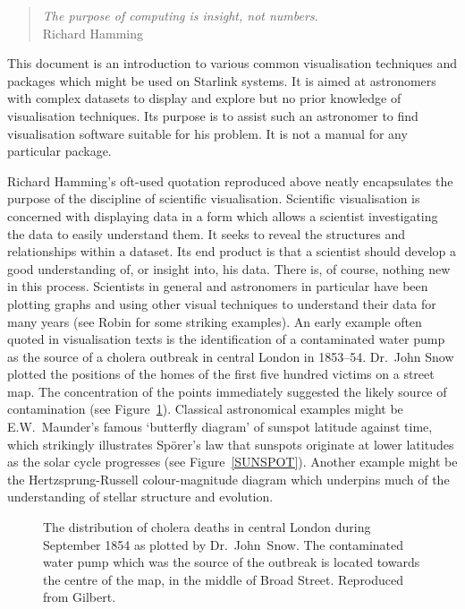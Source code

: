 \documentclass[twoside,11pt]{article}
\begin{document}
\begin{htmlonly}
\begin{quote}
{\it The purpose of computing is insight, not numbers.} \\
Richard Hamming
\end{quote}
\end{htmlonly}

This document is an introduction to various common visualisation
techniques and packages which might be used on Starlink systems. It is
aimed at astronomers with complex datasets to display and explore but
no prior knowledge of visualisation techniques. Its purpose is to
assist such an astronomer to find visualisation software suitable for his
problem. It is not a manual for any particular package.

Richard Hamming's oft-used quotation reproduced above\cite{HAMMING}
neatly encapsulates the purpose of the discipline of scientific
visualisation. Scientific visualisation is concerned with displaying data
in a form which allows a scientist investigating the data to easily
understand them. It seeks to reveal the structures and relationships within
a dataset. Its end product is that a scientist should develop a good
understanding of, or insight into, his data. There is, of course, nothing
new in this process. Scientists in general and astronomers in particular
have been plotting graphs and using other visual techniques to
understand their data for many years (see Robin\cite{ROBIN} for some
striking examples). An early example often quoted in visualisation texts
is the identification of a contaminated water pump as the source of a
cholera outbreak in central London in 1853--54. Dr.~John Snow plotted the
positions of the homes of the first five hundred victims on a street map.
The concentration of the points immediately suggested the likely source of
contamination (see Figure~\ref{CHOLERA}). Classical astronomical examples
might be E.W.~Maunder's famous `butterfly diagram' of sunspot latitude
against time, which strikingly illustrates Sp\"{o}rer's law that sunspots
originate at lower latitudes as the solar cycle progresses (see
Figure~\ref{SUNSPOT}). Another example might be the Hertzsprung-Russell
colour-magnitude diagram which underpins much of the understanding of
stellar structure and evolution.

\begin{figure}[htbp]
\begin{center}
\leavevmode
\epsfxsize=461pt
\end{center}

\caption[Cholera deaths in central London.]{The distribution of cholera
deaths in central London during September 1854 as plotted by
Dr.~John~Snow. The contaminated water pump which was the source of the
outbreak is located towards the centre of the map, in the middle of
Broad Street. Reproduced from Gilbert\cite{GILBERT}. \label{CHOLERA} }

\end{figure}
\end{document}
